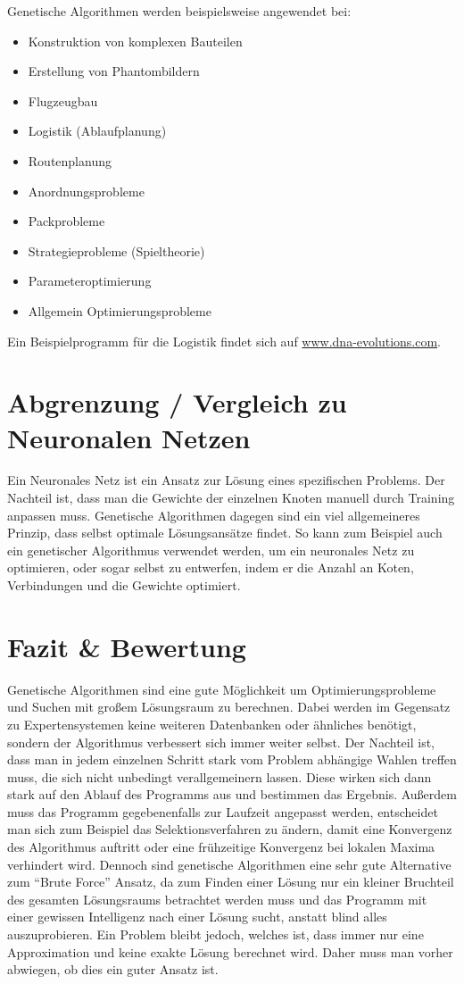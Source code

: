 Genetische Algorithmen werden beispielsweise angewendet bei:
\begin{itemize}
	\item Konstruktion von komplexen Bauteilen
	\item Erstellung von Phantombildern
	\item Flugzeugbau
	\item Logistik (Ablaufplanung)
	\item Routenplanung
	\item Anordnungsprobleme
	\item Packprobleme
	\item Strategieprobleme (Spieltheorie)
	\item Parameteroptimierung
	\item Allgemein Optimierungsprobleme
\end{itemize}

Ein Beispielprogramm für die Logistik findet sich auf \href{http://www.dna-evolutions.com}{www.dna-evolutions.com}.

\section{Abgrenzung / Vergleich zu Neuronalen Netzen}
Ein Neuronales Netz ist ein Ansatz zur Lösung eines spezifischen Problems. Der Nachteil ist, dass man die Gewichte der einzelnen Knoten manuell durch Training anpassen muss. Genetische Algorithmen dagegen sind ein viel allgemeineres Prinzip, dass selbst optimale Lösungsansätze findet. So kann zum Beispiel auch ein genetischer Algorithmus verwendet werden, um ein neuronales Netz zu optimieren, oder sogar selbst zu entwerfen, indem er die Anzahl an Koten, Verbindungen und die Gewichte optimiert.\\

\section{Fazit \& Bewertung}
Genetische Algorithmen sind eine gute Möglichkeit um Optimierungsprobleme und Suchen mit großem Lösungsraum zu berechnen. Dabei werden im Gegensatz zu Expertensystemen keine weiteren Datenbanken oder ähnliches benötigt, sondern der Algorithmus verbessert sich immer weiter selbst. Der Nachteil ist, dass man in jedem  einzelnen Schritt stark vom Problem abhängige Wahlen treffen muss, die sich nicht unbedingt verallgemeinern lassen. Diese wirken sich dann stark auf den Ablauf des Programms aus und bestimmen das Ergebnis. Außerdem muss das Programm gegebenenfalls zur Laufzeit angepasst werden, entscheidet man  sich zum Beispiel das Selektionsverfahren zu ändern, damit eine Konvergenz des Algorithmus auftritt oder eine frühzeitige Konvergenz bei lokalen Maxima verhindert wird. Dennoch sind genetische Algorithmen eine sehr gute Alternative zum "`Brute Force"' Ansatz, da zum Finden einer Lösung nur ein kleiner Bruchteil des gesamten Lösungsraums betrachtet werden muss und das Programm mit einer gewissen Intelligenz nach einer Lösung sucht, anstatt blind alles auszuprobieren. Ein Problem bleibt jedoch, welches ist, dass immer nur eine Approximation und keine exakte Lösung berechnet wird. Daher muss man vorher abwiegen, ob dies ein guter Ansatz ist.

